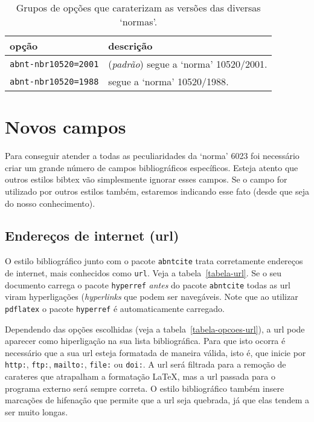 \documentclass[a4paper]{ltxdoc}
\begin{document}
\begin{table}[htbp]
\begin{center}
\begin{tabular}{lp{9cm}}\hline\hline
opção & descrição \\ \hline
{\tt abnt-nbr10520=2001} & (\emph{padrão}) segue a `norma' 10520/2001\cite{NBR10520:2001}.\\
{\tt abnt-nbr10520=1988} & segue a `norma' 10520/1988\cite{NBR10520:1988}.\\
\hline\hline
\end{tabular}
\end{center}
\caption[Versão das `normas' a ser usada]{
Grupos de opções que caraterizam as versões das diversas `normas'.}
\label{tabela-versao-normas}
\end{table}


\clearpage
\section{Novos campos}

Para conseguir atender a todas as peculiaridades da `norma' 6023\cite{NBR6023:2000}
foi necessário criar um grande número de campos bibliográficos específicos.
Esteja atento que outros estilos bibtex vão simplesmente ignorar esses campos.
Se o campo for utilizado por outros estilos também, estaremos indicando esse
fato (desde que seja do nosso conhecimento).

\subsection{Endereços de internet (url)}\label{sec-url}

O estilo bibliográfico junto com o pacote {\tt abntcite} trata corretamente
endereços de internet, mais conhecidos como {\tt url}. Veja a tabela~\ref{tabela-url}.
Se o seu documento carrega o pacote {\tt hyperref} \emph{antes} do
pacote {\tt abntcite} todas as url viram hyperligações (\emph{hyperlinks}
que podem ser navegáveis. Note que ao utilizar {\tt pdflatex} o
pacote {\tt hyperref} é automaticamente carregado.

Dependendo das opções escolhidas (veja a tabela~\ref{tabela-opcoes-url}),
a url pode aparecer como hiperligação na
sua lista bibliográfica. Para que isto ocorra é necessário que a sua url
esteja formatada de maneira válida, isto é, que inicie por
{\tt http:}, {\tt ftp:}, {\tt mailto:}, {\tt file:} ou {\tt doi:}.
A url será filtrada para a remoção de carateres que atrapalham a formatação
\LaTeX, mas a url passada para o programa externo será sempre correta.
O estilo bibliográfico também insere marcações de hifenação que permite que
a url seja quebrada, já que elas tendem a ser muito longas.
\end{document}
